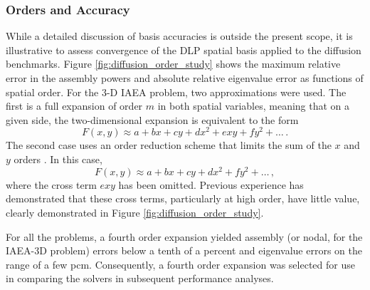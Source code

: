 \subsubsection{Orders and Accuracy}
\label{sec:diffusion_order_accuracy}

While a detailed discussion of basis accuracies is outside the 
present scope, it is illustrative to assess convergence 
of the DLP spatial basis applied to the diffusion benchmarks.  
Figure \ref{fig:diffusion_order_study}
 shows the maximum relative error in the assembly 
powers and absolute relative eigenvalue error as functions of spatial order.
For the 
3-D IAEA problem, two approximations were used.  The first is a full 
expansion of order $m$ in both spatial variables, meaning that on a given 
side, the two-dimensional expansion is equivalent to the form 
\begin{equation}
 F(x, y) \approx a + bx + cy + d x^2 + e xy + f y^2 + \ldots \, .
\end{equation}
The second case uses an order reduction scheme that 
limits the sum of the $x$ and $y$ orders \cite{forget2006tdh}.  In this case,
\begin{equation}
 F(x, y) \approx a + bx + cy + d x^2 + f y^2 + \ldots \, ,
\end{equation}
where the cross term $e xy$ has been omitted.  Previous experience 
has demonstrated that these cross terms, particularly at high order, have 
little value, clearly demonstrated in Figure \ref{fig:diffusion_order_study}.


For all the problems, a fourth order expansion yielded assembly 
(or nodal, for the IAEA-3D problem) errors below a tenth of a percent 
and eigenvalue errors on the range of a few pcm.  Consequently, a fourth 
order expansion was selected for use in comparing the solvers in 
subsequent performance analyses.

